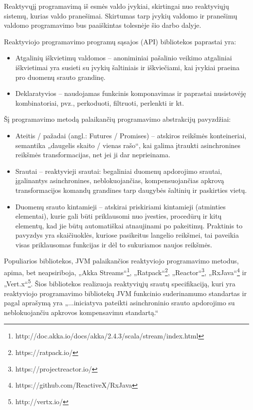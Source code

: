 Reaktyvųjį programavimą iš esmės valdo įvykiai, skirtingai nuo reaktyviųjų sistemų, kurias valdo pranešimai. Skirtumas tarp įvykių valdomo ir pranešimų valdomo programavimo bus paaiškintas tolesnėje šio darbo dalyje.

Reaktyviojo programavimo programų sąsajos (API) bibliotekos paprastai yra:

\begin{itemize}
  \item Atgalinių iškvietimų valdomos – anoniminiai pašalinio veikimo atgaliniai iškvietimai yra susieti su įvykių šaltiniais ir iškviečiami, kai įvykiai praeina pro duomenų srauto grandinę.
  \item Deklaratyvios – naudojamas funkcinis komponavimas ir paprastai nusistovėję kombinatoriai, pvz., perkoduoti, filtruoti, perlenkti ir kt.
\end{itemize}

Šį programavimo metodą palaikančių programavimo abstrakcijų pavyzdžiai:

\begin{itemize}
  \item Ateitis / pažadai (angl.: Futures / Promises) – atskiros reikšmės konteineriai, semantika „daugelis skaito / vienas rašo“, kai galima įtraukti asinchronines reikšmės transformacijas, net jei ji dar neprieinama. \cite{Jef15:FRPPromises}
  \item Srautai – reaktyvieji srautai: begaliniai duomenų apdorojimo srautai, įgalinantys asinchronines, neblokuojančias, kompensuojančias apkrovą transformacijos komandų grandines tarp daugybės šaltinių ir paskirties vietų.
  \item Duomenų srauto kintamieji – atskirai priskiriami kintamieji (atminties elementai), kurie gali būti priklausomi nuo įvesties, procedūrų ir kitų elementų, kad jie būtų automatiškai atnaujinami po pakeitimų. Praktinis to pavyzdys yra skaičiuoklės, kuriose pasikeitus langelio reikšmei, tai paveikia visas priklausomas funkcijas ir dėl to sukuriamos naujos reikšmės.
\end{itemize}

Populiarios bibliotekos, JVM palaikančios reaktyviojo programavimo metodus, apima, bet neapsiriboja, „Akka Streams“\footnote{http://doc.akka.io/docs/akka/2.4.3/scala/stream/index.html}, „Ratpack“\footnote{https://ratpack.io/}, „Reactor“\footnote{https://projectreactor.io/}, „RxJava“\footnote{https://github.com/ReactiveX/RxJava} ir „Vert.x“\footnote{http://vertx.io/}. Šios bibliotekos realizuoja reaktyviųjų srautų specifikaciją, kuri yra reaktyviojo programavimo bibliotekų JVM funkcinio suderinamumo standartas ir pagal aprašymą yra „...iniciatyva pateikti asinchroninio srauto apdorojimo su neblokuojančiu apkrovos kompensavimu standartą.“

